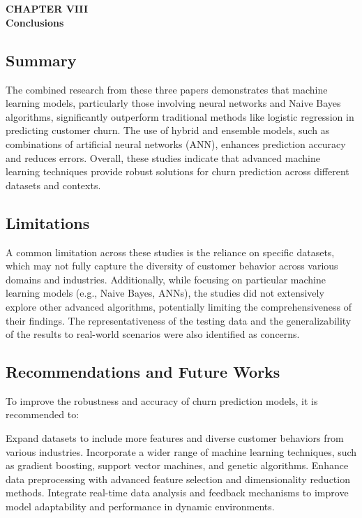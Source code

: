 \section*{}
\begin{center}
    {\fontsize{14}{1.5}\selectfont \textbf{CHAPTER VIII}}\\
    \vspace{12pt}
    {\fontsize{16}{1.5}\selectfont \textbf{Conclusions}}\\
    \vspace{12pt}
    \vspace{12pt}
\end{center}

\setcounter{section}{8}
\setcounter{subsection}{0}

\subsection{Summary} {
The combined research from these three papers demonstrates that machine learning models, particularly those involving neural networks and Naive Bayes algorithms, significantly outperform traditional methods like logistic regression in predicting customer churn. The use of hybrid and ensemble models, such as combinations of artificial neural networks (ANN), enhances prediction accuracy and reduces errors. Overall, these studies indicate that advanced machine learning techniques provide robust solutions for churn prediction across different datasets and contexts.
}
\subsection{Limitations} {
A common limitation across these studies is the reliance on specific datasets, which may not fully capture the diversity of customer behavior across various domains and industries. Additionally, while focusing on particular machine learning models (e.g., Naive Bayes, ANNs), the studies did not extensively explore other advanced algorithms, potentially limiting the comprehensiveness of their findings. The representativeness of the testing data and the generalizability of the results to real-world scenarios were also identified as concerns.
}

\subsection{Recommendations and Future Works} {
To improve the robustness and accuracy of churn prediction models, it is recommended to:

    Expand datasets to include more features and diverse customer behaviors from various industries.
    Incorporate a wider range of machine learning techniques, such as gradient boosting, support vector machines, and genetic algorithms.
    Enhance data preprocessing with advanced feature selection and dimensionality reduction methods.
    Integrate real-time data analysis and feedback mechanisms to improve model adaptability and performance in dynamic environments.

}